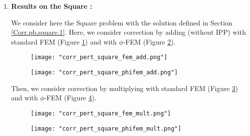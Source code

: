 \begin{enumerate}[label=\textbullet]
	\item \textbf{Results on the Square :}
	
	We consider here the Square problem with the solution defined in Section \ref{Corr.pb.square.1}. Here, we consider correction by adding (without IPP) with standard FEM (Figure \ref{corr_pert_square_fem_add}) and with $\phi$-FEM (Figure \ref{corr_pert_square_phifem_add}).
	
	\begin{minipage}{0.48\linewidth}
		\begin{figure}[H]
			\centering
			\texttt{[image: "corr\_pert\_square\_fem\_add.png"]}
			\label{corr_pert_square_fem_add}
		\end{figure} 
	\end{minipage}
	\begin{minipage}{0.48\linewidth}
		\begin{figure}[H]
			\centering
			\texttt{[image: "corr\_pert\_square\_phifem\_add.png"]}
			\label{corr_pert_square_phifem_add}
		\end{figure} 
	\end{minipage}
	
	Then, we consider correction by multiplying with standard FEM (Figure \ref{corr_pert_square_fem_mult}) and with $\phi$-FEM (Figure \ref{corr_pert_square_phifem_mult}).
	
	\begin{minipage}{0.48\linewidth}
		\begin{figure}[H]
			\centering
			\texttt{[image: "corr\_pert\_square\_fem\_mult.png"]}
			\label{corr_pert_square_fem_mult}
		\end{figure} 
	\end{minipage}
	\begin{minipage}{0.48\linewidth}
		\begin{figure}[H]
			\centering
			\texttt{[image: "corr\_pert\_square\_phifem\_mult.png"]}
			\label{corr_pert_square_phifem_mult}
		\end{figure} 
	\end{minipage}
\end{enumerate}

